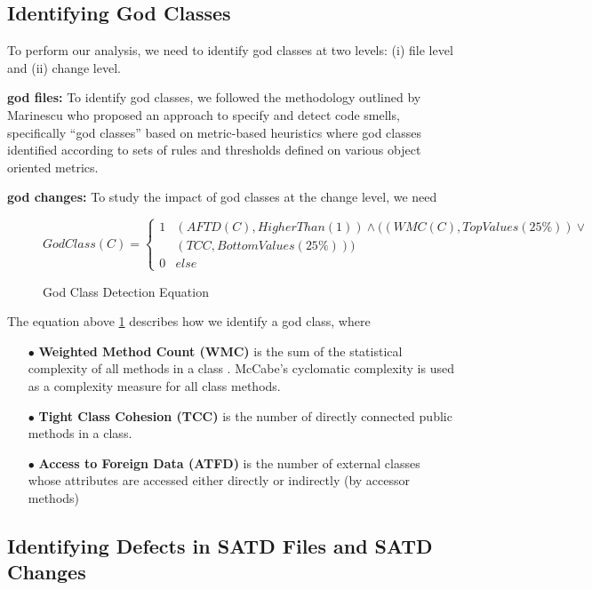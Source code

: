 \subsection{Identifying God Classes}
\label{god}

To perform our analysis, we need to identify god classes at two levels: (i) file level and (ii) change level.

\textbf{god files:} To identify god classes, we followed the methodology outlined by Marinescu \cite{marinescu2004detection} who proposed an approach to specify and detect
code smells, specifically ``god classes'' based on metric-based heuristics where god classes identified according to sets of rules and thresholds defined on various object oriented metrics.

\noindent\textbf{god changes:}
To study the impact of god classes at the change level, we need 



\begin{figure}[h]
\[GodClass(C) = \left\{\begin{matrix}
1& (AFTD(C), HigherThan(1))  \wedge ((WMC(C), TopValues(25\%)) \vee \\ 
 & (TCC, BottomValues(25\%)))\\ 
0& else
\end{matrix}\right.\]
\caption{God Class Detection Equation}
\label{equation:1}
\end{figure}

The equation above \ref{equation:1} describes how we identify a god class, where 


\begin{itemize}
\item[$\bullet$] \textbf{Weighted Method Count (WMC)} is the sum of the statistical complexity of all methods in a class . McCabe’s cyclomatic complexity \cite{McCabe_1976} is used as a complexity measure for all class methods.
\item[$\bullet$] \textbf{Tight Class Cohesion (TCC)} is the number of directly connected public methods in a class. 
\item[$\bullet$] \textbf{Access to Foreign Data (ATFD)} is the number of external classes whose attributes are accessed either directly or indirectly (by accessor methods) \cite{Marinescu_PhD}
\end{itemize}

\subsection{Identifying Defects in SATD Files and SATD Changes}
\label{bugs}

